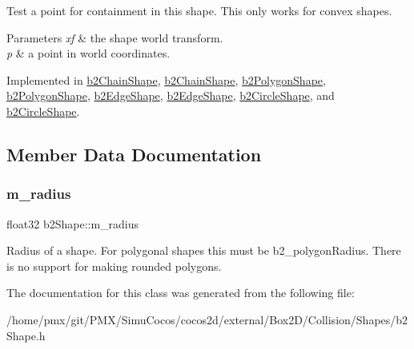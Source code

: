 Test a point for containment in this shape. This only works for convex shapes. 
\begin{DoxyParams}{Parameters}
{\em xf} & the shape world transform. \\
\hline
{\em p} & a point in world coordinates. \\
\hline
\end{DoxyParams}


Implemented in \hyperlink{classb2ChainShape_afd03c8679f18f9962a6c76bde629c62a}{b2\+Chain\+Shape}, \hyperlink{classb2ChainShape_a2d2d59b49c2611ad65ed68b0943d642d}{b2\+Chain\+Shape}, \hyperlink{classb2PolygonShape_a1e70b4546c997628bbc8eeffe55c2423}{b2\+Polygon\+Shape}, \hyperlink{classb2PolygonShape_a129c4ac76727fe02724f675e3fef7fe5}{b2\+Polygon\+Shape}, \hyperlink{classb2EdgeShape_a23a429c4cf919ff5140ca28b53db43fe}{b2\+Edge\+Shape}, \hyperlink{classb2EdgeShape_a15151673cf9ad585779c70363425f470}{b2\+Edge\+Shape}, \hyperlink{classb2CircleShape_a764b0ec9fbd65c9ea091672a25eefcf7}{b2\+Circle\+Shape}, and \hyperlink{classb2CircleShape_a84e22b3807e84b72f2981010fc197099}{b2\+Circle\+Shape}.



\subsection{Member Data Documentation}
\mbox{\label{classb2Shape_a5de7a9bd3f9e72ef7025a65c304aaf1a}} 
\subsubsection{\texorpdfstring{m\+\_\+radius}{m\_radius}}
{\footnotesize\ttfamily float32 b2\+Shape\+::m\+\_\+radius}

Radius of a shape. For polygonal shapes this must be b2\+\_\+polygon\+Radius. There is no support for making rounded polygons. 

The documentation for this class was generated from the following file\+:\begin{DoxyCompactItemize}
\item 
/home/pmx/git/\+P\+M\+X/\+Simu\+Cocos/cocos2d/external/\+Box2\+D/\+Collision/\+Shapes/b2\+Shape.\+h\end{DoxyCompactItemize}
